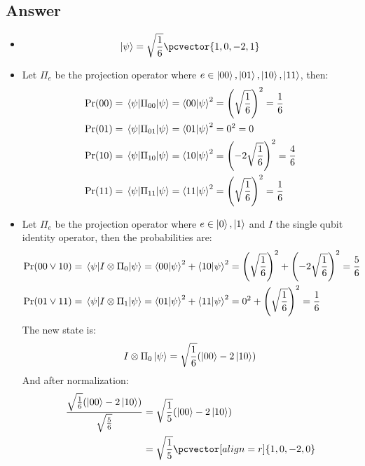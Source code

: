 \subsection*{Answer}
\begin{itemize}
    \item[a)]
        \begin{align*}
            \ket{\psi} = \sqrt{\frac{1}{6}}\pcvector{1,0,-2,1}
        \end{align*}
    \item[b)] Let $\Pi_e$ be the projection operator where $e\in{\ket{00},\ket{01},\ket{10},\ket{11}}$, then:
        \begin{align*}
            \Pr(00) &= \expval{\Pi_{00}}{\psi} = \braket{00}{\psi}^2 = \left(\sqrt{\frac{1}{6}}\right)^2 = \frac{1}{6}\\
            \Pr(01) &= \expval{\Pi_{01}}{\psi} = \braket{01}{\psi}^2 = 0^2 = 0\\
            \Pr(10) &= \expval{\Pi_{10}}{\psi} = \braket{10}{\psi}^2 = \left(-2\sqrt{\frac{1}{6}}\right)^2 = \frac{4}{6}\\
            \Pr(11) &= \expval{\Pi_{11}}{\psi} = \braket{11}{\psi}^2 = \left(\sqrt{\frac{1}{6}}\right)^2 = \frac{1}{6}\\
        \end{align*}
    \item[c)] Let $\Pi_e$ be the projection operator where $e\in{\ket{0},\ket{1}}$ and $I$ the single qubit identity operator, then the probabilities are:
    \begin{align*}
        \Pr(00\vee10) &= \expval{I\otimes\Pi_0}{\psi} = \braket{00}{\psi}^2 + \braket{10}{\psi}^2= \left(\sqrt{\frac{1}{6}}\right)^2 + \left(-2\sqrt{\frac{1}{6}}\right)^2= \frac{5}{6}\\
        \Pr(01\vee11) &= \expval{I\otimes\Pi_1}{\psi} = \braket{01}{\psi}^2 + \braket{11}{\psi}^2= 0^2 + \left(\sqrt{\frac{1}{6}}\right)^2 = \frac{1}{6}\\
    \end{align*}
    The new state is:
    \begin{align*}
        I\otimes\Pi_0\ket{\psi} =  \sqrt{\frac{1}{6}}(\ket{00}-2\ket{10})
    \end{align*}
    And after normalization:
    \begin{align*}
        \frac{\sqrt{\frac{1}{6}}(\ket{00}-2\ket{10})}{\sqrt{\frac{5}{6}}}
        &=  \sqrt{\frac{1}{5}}(\ket{00}-2\ket{10})\\
        &= \sqrt{\frac{1}{5}}\pcvector[align=r]{1,0,-2,0}

\end{align*}
\end{itemize}
